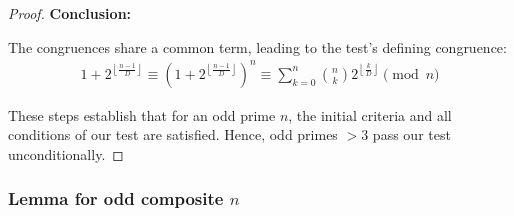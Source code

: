 \documentclass{article}
\theoremstyle{plain}
\theoremstyle{definition}
\begin{document}
\begin{proof}
\textbf{Conclusion:} \label{proof:primes:conclusion}

    The congruences share a common term, leading to the test's defining congruence:
    \begin{align}
        1 + 2^{\left\lfloor \frac{n-1}{D} \right\rfloor} \equiv \left(1 + 2^{\left\lfloor \frac{n-1}{D} \right\rfloor}\right)^{n} \equiv \sum_{k=0}^{n} \binom{n}{k}2^{\left\lfloor \frac{k}{D} \right\rfloor} \pmod{n}
    \end{align}

    These steps establish that for an odd prime $n$, the initial criteria and all conditions of our test are satisfied. Hence, odd primes $>3$ pass our test unconditionally.
\end{proof}

\subsubsection[Lemma for odd composite n]{Lemma for odd composite $n$}
\end{document}
